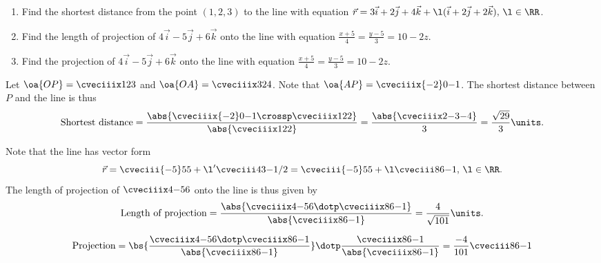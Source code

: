 \begin{problem}
    \begin{enumerate}
        \item Find the shortest distance from the point $(1, 2, 3)$ to the line with equation $\vec r = 3\vec i + 2\vec j + 4\vec k + \l(\vec i + 2\vec j + 2\vec k), \, \l \in \RR$.
        \item Find the length of projection of $4\vec i - 5 \vec j + 6 \vec k$ onto the line with equation $\frac{x+5}4 = \frac{y-5}3 = 10-2z$.
        \item Find the projection of $4\vec i - 5 \vec j + 6 \vec k$ onto the line with equation $\frac{x+5}4 = \frac{y-5}3 = 10-2z$.
    \end{enumerate}
\end{problem}
\begin{solution}
    \begin{ppart}
        Let $\oa{OP} = \cveciiix123$ and $\oa{OA} = \cveciiix324$. Note that $\oa{AP} = \cveciiix{-2}0{-1}$. The shortest distance between $P$ and the line is thus \[\text{Shortest distance} = \frac{\abs{\cveciiix{-2}0{-1} \crossp \cveciiix122}}{\abs{\cveciiix122}} = \frac{\abs{\cveciiix2{-3}{-4}}}3 = \frac{\sqrt{29}}3 \units.\]
    \end{ppart}
    \begin{ppart}
        Note that the line has vector form \[\vec r = \cveciii{-5}55 + \l' \cveciii43{-1/2} = \cveciii{-5}55 + \l \cveciii86{-1}, \, \l \in \RR.\] The length of projection of $\cveciiix4{-5}6$ onto the line is thus given by \[\text{Length of projection} = \frac{\abs{\cveciiix4{-5}6 \dotp \cveciiix86{-1}}}{\abs{\cveciiix86{-1}}} = \frac{4}{\sqrt{101}} \units.\]
    \end{ppart}
    \begin{ppart}
        \begin{align*}
            \text{Projection} = \bs{\frac{\cveciiix4{-5}6 \dotp \cveciiix86{-1}}{\abs{\cveciiix86{-1}}}} \dotp \frac{\cveciiix86{-1}}{\abs{\cveciiix86{-1}}} = \frac{-4}{101} \cveciii86{-1}
        \end{align*}
    \end{ppart}
\end{solution}

